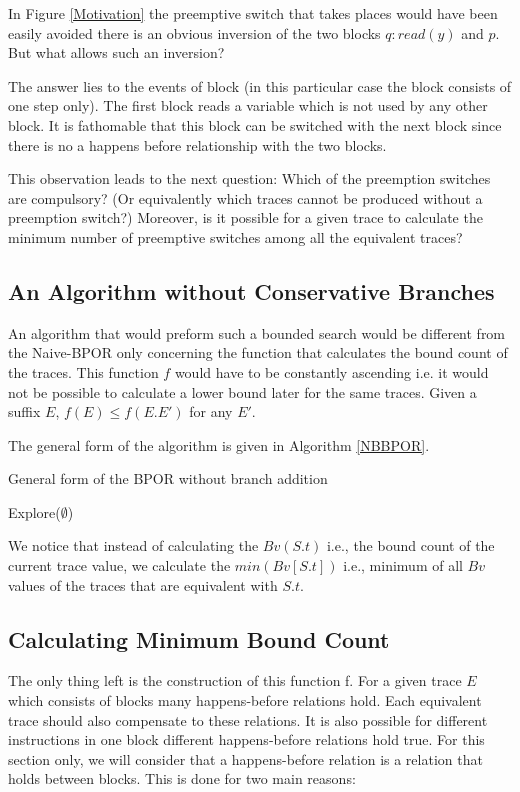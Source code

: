 In Figure \ref{Motivation} the preemptive switch that takes places would have been easily avoided there is an obvious inversion of the two blocks $q:read(y)$ and $p$.
But what allows such an inversion?

The answer lies to the events of block (in this particular case the block consists of one step only). The first block reads a variable which is not used by any other block. 
It is fathomable that this block can be switched with the
next block since there is no a happens before relationship with the two blocks.

This observation leads to the next question: Which of the preemption switches are compulsory? (Or equivalently which traces cannot be produced without a preemption switch?)
Moreover, is it possible for a given trace to calculate the minimum number of preemptive switches among all the equivalent traces?

\subsection{An Algorithm without Conservative Branches}
An algorithm that would preform such a bounded search would be different from the Naive-BPOR only concerning the function that calculates the bound count 
of the traces. This function $f$ would have to be constantly ascending i.e. it would not be possible to calculate a lower bound later for the same traces.
Given a suffix $E$, $f(E) \leq f(E.E')$ for any $E'$.

The general form of the algorithm is given in Algorithm \ref{NBBPOR}.

\begin{algorithm}[H]
    \SetAlgoLined
    \caption{General form of the BPOR without branch addition}
    \label{NBBPOR}
    Explore($\emptyset$)\;
\end{algorithm}

We notice that instead of calculating the $Bv(S.t)$ i.e., the bound count of the current trace value, 
we calculate the $min(Bv[S.t])$ i.e., minimum of all $Bv$ values of the traces that are equivalent with $S.t$.

\subsection{Calculating Minimum Bound Count}
The only thing left is the construction of this function f.
For a given trace $E$ which consists of blocks many happens-before relations hold. Each equivalent trace should also compensate to these relations.
It is also possible for different instructions in one block different happens-before relations hold true. For this section only, we will consider that 
a happens-before relation is a relation that holds between blocks. This is done for two main reasons:

